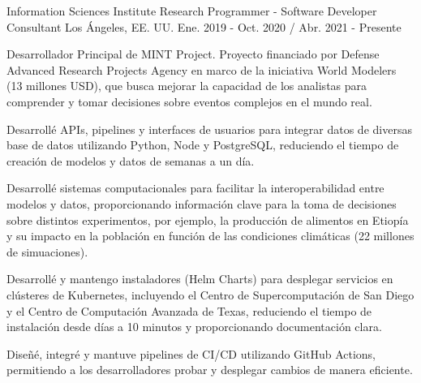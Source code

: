\begin{cventries}

  \cventry
    {Information Sciences Institute}
    {Research Programmer - Software Developer Consultant}
    {Los Ángeles, EE. UU.}
    {Ene. 2019 - Oct. 2020 / Abr. 2021 - Presente}
    {
      \begin{cvitems}
        \item{Desarrollador Principal de MINT Project. Proyecto financiado por Defense Advanced Research Projects Agency en marco de la iniciativa World Modelers (13 millones USD), que busca mejorar la capacidad de los analistas para comprender y tomar decisiones sobre eventos complejos en el mundo real.}
        \item{Desarrollé APIs, pipelines y interfaces de usuarios para integrar datos de diversas base de datos utilizando Python, Node y PostgreSQL, reduciendo el tiempo de creación de modelos y datos de semanas a un día.}
        \item{Desarrollé sistemas computacionales para facilitar la interoperabilidad entre modelos y datos, proporcionando información clave para la toma de decisiones sobre distintos experimentos, por ejemplo, la producción de alimentos en Etiopía y su impacto en la población en función de las condiciones climáticas (22 millones de simuaciones).}
        \item{Desarrollé y mantengo instaladores (Helm Charts) para desplegar servicios en clústeres de Kubernetes, incluyendo el Centro de Supercomputación de San Diego y el Centro de Computación Avanzada de Texas, reduciendo el tiempo de instalación desde días a 10 minutos y proporcionando documentación clara.}
        \item{Diseñé, integré y mantuve pipelines de CI/CD utilizando GitHub Actions, permitiendo a los desarrolladores probar y desplegar cambios de manera eficiente.}
      \end{cvitems}
    }


\end{cventries}
